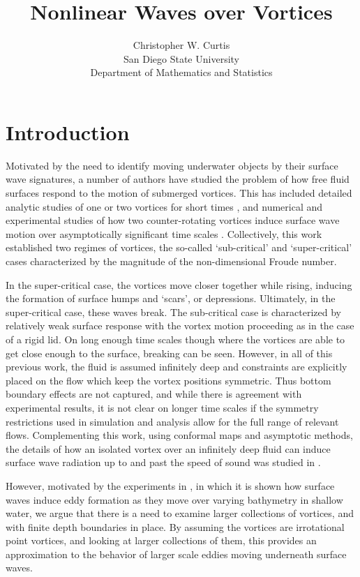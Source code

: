 \documentclass[a4paper,11pt]{article}
\title{Nonlinear Waves over Vortices}
\author{Christopher W. Curtis\\ San Diego State University\\ Department of Mathematics and Statistics}
\date{}
\begin{document}
\maketitle
\section{Introduction}
Motivated by the need to identify moving underwater objects by their surface wave signatures, a number of authors have studied the problem of how free fluid surfaces respond to the motion of submerged vortices.  This has included detailed analytic studies of one or two vortices for short times \cite{tyvand1,tyvand2}, and numerical and experimental studies of how two counter-rotating vortices induce surface wave motion over asymptotically significant time scales \cite{marcus,telste,tryggvason}.  Collectively, this work established two regimes of vortices, the so-called `sub-critical' and `super-critical' cases characterized by the magnitude of the non-dimensional Froude number.  

In the super-critical case, the vortices move closer together while rising, inducing the formation of surface humps and `scars', or depressions.  Ultimately, in the super-critical case, these waves break.  The sub-critical case is characterized by relatively weak surface response with the vortex motion proceeding as in the case of a rigid lid.  On long enough time scales though where the vortices are able to get close enough to the surface, breaking can be seen.  However, in all of this previous work, the fluid is assumed infinitely deep and constraints are explicitly placed on the flow which keep the vortex positions symmetric.  Thus bottom boundary effects are not captured, and while there is agreement with experimental results, it is not clear on longer time scales if the symmetry restrictions used in simulation and analysis allow for the full range of relevant flows.  Complementing this work, using conformal maps and asymptotic methods, the details of how an isolated vortex over an infinitely deep fluid can induce surface wave radiation up to and past the speed of sound was studied in \cite{ruban}.       

However, motivated by the experiments in \cite{lin,liu1,liu2}, in which it is shown how surface waves induce eddy formation as they move over varying bathymetry in shallow water, we argue that there is a need to examine larger collections of vortices, and with finite depth boundaries in place.  By assuming the vortices are irrotational point vortices, and looking at larger collections of them, this provides an approximation to the behavior of larger scale eddies moving underneath surface waves.
\end{document}
